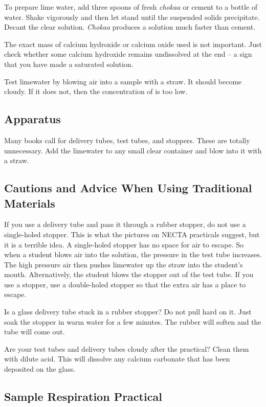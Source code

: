 To prepare lime water, add three spoons of fresh \textit{chokaa} or cement to a bottle of water. Shake vigorously and then let stand until the suspended solids precipitate. Decant the clear solution. \textit{Chokaa} produces a solution much faster than cement.

The exact mass of calcium hydroxide or calcium oxide used is not important. Just check whether some calcium hydroxide remains undissolved at the end -- a sign that you have made a saturated solution.

Test limewater by blowing air into a sample with a straw. It should become cloudy. If it does not, then the concentration of  is too low.

\subsection{Apparatus}
Many books call for delivery tubes, test tubes, and stoppers. These are totally unnecessary. Add the limewater to any small clear container and blow into it with a straw.

\subsection{Cautions and Advice When Using Traditional Materials}
If you use a delivery tube and pass it through a rubber stopper, do not use a single-holed stopper. This is what the pictures on NECTA practicals suggest, but it is a terrible idea. A single-holed stopper has no space for air to escape. So when a student blows air into the solution, the pressure in the test tube increases. The high pressure air then pushes limewater up the straw into the student's mouth. Alternatively, the student blows the stopper out of the test tube. If you use a stopper, use a double-holed stopper so that the extra air has a place to escape.

Is a glass delivery tube stuck in a rubber stopper? Do not pull hard on it. Just soak the stopper in warm water for a few minutes. The rubber will soften and the tube will come out.

Are your test tubes and delivery tubes cloudy after the practical? Clean them with dilute acid. This will dissolve any calcium carbonate that has been deposited on the glass.

\subsection{Sample Respiration Practical}

